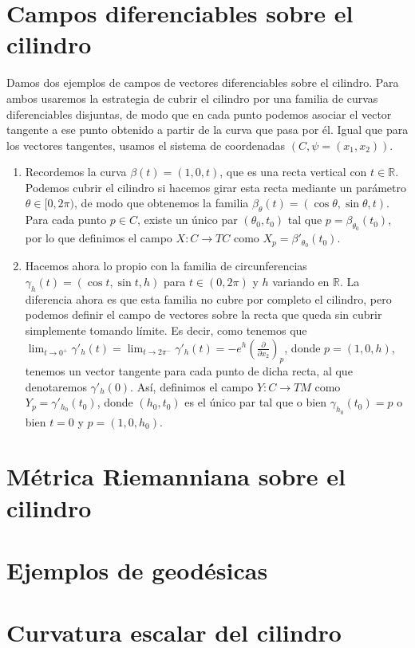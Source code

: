 \documentclass[twoside, 11pt]{article}
\theoremstyle{definition}
\newcommand{\R}{\mathbb{R}}
\newcommand{\parcial}[2]{\frac{\partial #1}{\partial #2}}
\begin{document}
\section{Campos diferenciables sobre el cilindro}

Damos dos ejemplos de campos de vectores diferenciables sobre el cilindro. Para ambos usaremos la estrategia de cubrir el cilindro por una familia de curvas diferenciables disjuntas, de modo que en cada punto podemos asociar el vector tangente a ese punto obtenido a partir de la curva que pasa por él. Igual que para los vectores tangentes, usamos el sistema de coordenadas $(C,\psi=(x_1,x_2))$. 

\begin{enumerate}
\item
 Recordemos la curva $\beta(t)=(1,0,t)$, que es una recta vertical con $t\in\R$. Podemos cubrir el cilindro si hacemos girar esta recta mediante un parámetro $\theta\in[0,2\pi)$, de modo que obtenemos la familia $\beta_\theta(t)=(\cos\theta,\sin\theta, t)$. Para cada punto $p\in C$, existe un único par  $(\theta_0,t_0)$ tal que $p=\beta_{\theta_0}(t_0)$, por lo que definimos el campo $X:C\to TC$ como $X_p=\beta'_{\theta_0}(t_0)$.
 
\item Hacemos ahora lo propio con la familia de circunferencias $\gamma_h(t)=(\cos t,\sin t, h)$ para $t\in (0,2\pi)$ y $h$ variando en $\R$. La diferencia ahora es que esta familia no cubre por completo el cilindro, pero podemos definir el campo de vectores sobre la recta que queda sin cubrir simplemente tomando límite. Es decir, como tenemos que $\lim_{t\to 0^+}\gamma'_h(t)=\lim_{t\to 2\pi^-}\gamma'_h(t)=-e^h\left(\parcial{}{x_2}\right)_p$, donde $p=(1,0,h)$, tenemos un vector tangente para cada punto de dicha recta, al que denotaremos $\gamma'_h(0)$. Así, definimos el campo $Y:C\to TM$ como $Y_p=\gamma'_{h_0}(t_0)$, donde $(h_0, t_0)$ es el único par tal que o bien $\gamma_{h_0}(t_0)=p$ o bien $t=0$ y $p=(1,0,h_0)$. 

\end{enumerate}

\section{Métrica Riemanniana sobre el cilindro}




\section{Ejemplos de geodésicas}




\section{Curvatura escalar del cilindro}
\end{document}
